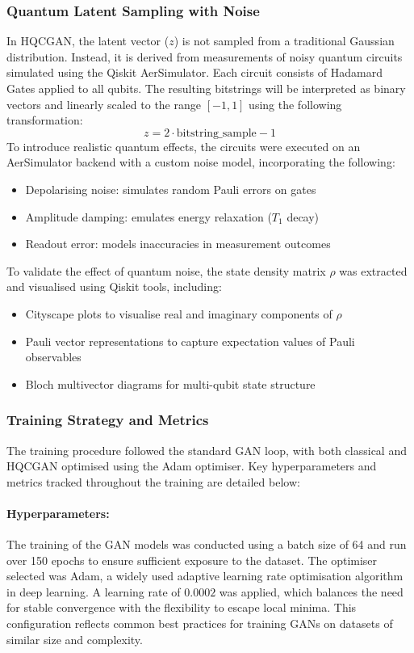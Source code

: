 \documentclass[conference]{IEEEtran}
\begin{document}
\subsubsection{Quantum Latent Sampling with Noise}

In HQCGAN, the latent vector ($z$) is not sampled from a traditional Gaussian distribution. Instead, it is derived from measurements of noisy quantum circuits simulated using the Qiskit AerSimulator. Each circuit consists of Hadamard Gates applied to all qubits. The resulting bitstrings will be interpreted as binary vectors and linearly scaled to the range $[-1, 1]$ using the following transformation:
\begin{equation}
z = 2 \cdot \text{bitstring\_sample} - 1
\end{equation}
To introduce realistic quantum effects, the circuits were executed on an AerSimulator backend with a custom noise model, incorporating the following: 
\begin{itemize}
\item Depolarising noise: simulates random Pauli errors on gates
\item Amplitude damping: emulates energy relaxation ($T_1$ decay)
\item Readout error: models inaccuracies in measurement outcomes
\end{itemize}
To validate the effect of quantum noise, the state density matrix $\rho$ was extracted and visualised using Qiskit tools, including:
\begin{itemize}
\item Cityscape plots to visualise real and imaginary components of $\rho$
\item Pauli vector representations to capture expectation values of Pauli observables
\item Bloch multivector diagrams for multi-qubit state structure
\end{itemize}

\subsubsection{Training Strategy and Metrics}\label{Training Strategy}
The training procedure followed the standard GAN loop, with both classical and HQCGAN optimised using the Adam optimiser. Key hyperparameters and metrics tracked throughout the training are detailed below:

\paragraph{Hyperparameters:}
The training of the GAN models was conducted using a batch size of 64 and run over 150 epochs to ensure sufficient exposure to the dataset. The optimiser selected was Adam, a widely used adaptive learning rate optimisation algorithm in deep learning. A learning rate of $0.0002$ was applied, which balances the need for stable convergence with the flexibility to escape local minima. This configuration reflects common best practices for training GANs on datasets of similar size and complexity.
\end{document}
